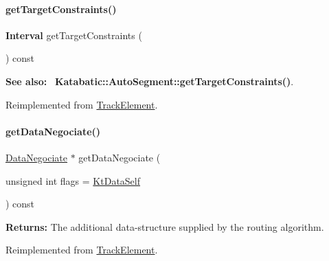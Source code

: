 \mbox{\label{classKite_1_1TrackSegment_a69af7d4287bc0e44c9ca2c8e6f692be9}} 
\paragraph{\texorpdfstring{get\+Target\+Constraints()}{getTargetConstraints()}}
{\footnotesize\ttfamily \textbf{ Interval} get\+Target\+Constraints (\begin{DoxyParamCaption}{ }\end{DoxyParamCaption}) const\hspace{0.3cm}{\ttfamily [virtual]}}

{\bfseries See also\+:}~ \textbf{ Katabatic\+::\+Auto\+Segment\+::get\+Target\+Constraints()}. 

Reimplemented from \mbox{\hyperlink{classKite_1_1TrackElement_a69af7d4287bc0e44c9ca2c8e6f692be9}{Track\+Element}}.

\mbox{\label{classKite_1_1TrackSegment_acd0170a05128ec4af16ecd0060c3a3b5}} 
\paragraph{\texorpdfstring{get\+Data\+Negociate()}{getDataNegociate()}}
{\footnotesize\ttfamily \mbox{\hyperlink{classKite_1_1DataNegociate}{Data\+Negociate}} $\ast$ get\+Data\+Negociate (\begin{DoxyParamCaption}\item[{unsigned int}]{flags = {\ttfamily \mbox{\hyperlink{namespaceKite_acca8fffa3182dea5f94208f454f14b47a68e917ff37d4b5cef906303181836404}{Kt\+Data\+Self}}} }\end{DoxyParamCaption}) const\hspace{0.3cm}{\ttfamily [virtual]}}

{\bfseries Returns\+:} The additional data-\/structure supplied by the routing algorithm. 

Reimplemented from \mbox{\hyperlink{classKite_1_1TrackElement_acd0170a05128ec4af16ecd0060c3a3b5}{Track\+Element}}.



